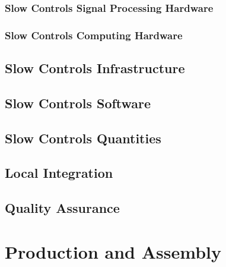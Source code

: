 \subsubsection{Slow Controls Signal Processing Hardware}

\subsubsection{Slow Controls Computing Hardware}


\subsection{Slow Controls Infrastructure}
\label{sec:fdsp-slow-cryo-slow-infra}

\subsection{Slow Controls Software}
\label{sec:fdsp-slow-cryo-sw}

\subsection{Slow Controls Quantities}
\label{sec:fdsp-slow-cryo-quant}

\subsection{Local Integration}
\label{sec:fdsp-slow-cryo-slow-loc-integ}

\subsection{Quality Assurance}
\label{sec:fdsp-slow-cryo-slow-qa}



\section{Production and Assembly}
\label{sec:fdsp-slow-cryo-prod-assy}




